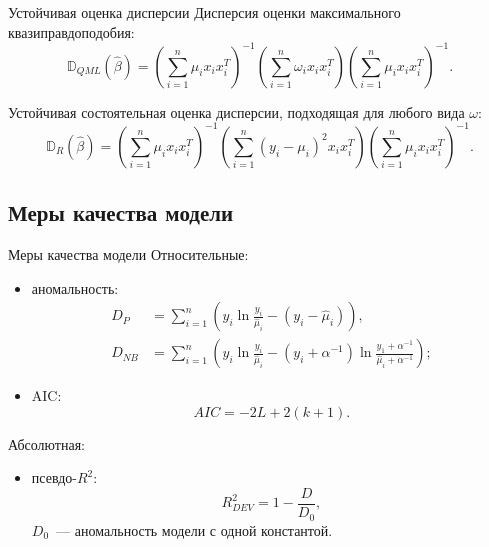 \documentclass[9pt,pdf,utf8,hyperref={unicode},aspectratio=169]{beamer}
\begin{document}
\begin{frame}{Устойчивая оценка дисперсии}
	Дисперсия оценки максимального квазиправдоподобия:
	$$\mathbb{D}_{QML}\left(\hat{\beta}\right) = \left( \sum\limits_{i=1}^n \mu_i x_i x_i^T\right)^{-1} \left( \sum\limits_{i=1}^n \omega_i x_i x_i^T\right) \left( \sum\limits_{i=1}^n \mu_i x_i x_i^T \right)^{-1}. $$
	
	\bigskip
	
	Устойчивая состоятельная оценка дисперсии, подходящая для любого вида $\omega$:
	$$\mathbb{D}_{R}\left(\hat{\beta}\right) = \left( \sum\limits_{i=1}^n \mu_i x_i x_i^T\right)^{-1} \left( \sum\limits_{i=1}^n \left(y_i-\mu_i\right)^2 x_i x_i^T\right) \left( \sum\limits_{i=1}^n \mu_i x_i x_i^T \right)^{-1}. $$
\end{frame}

\subsection{Меры качества модели}
\begin{frame}{Меры качества модели}
	Относительные:
	\begin{itemize}
		\item аномальность:
		\begin{align*}
		D_P    &= \sum\limits_{i=1}^n \left( y_i \ln \frac{y_i}{\hat{\mu}_i} - \left(y_i-\hat{\mu}_i \right) \right), \\%
		D_{NB} &= \sum\limits_{i=1}^n \left( y_i \ln \frac{y_i}{\hat{\mu}_i} - \left(y_i+\alpha^{-1}\right)\ln \frac{y_1 + \alpha^{-1}}{\hat{\mu}_i + \alpha^{-1}} \right);
		\end{align*}
		\item AIC: $$AIC = -2L +2\left(k+1\right).$$
	\end{itemize}
	
	\bigskip
	
	Абсолютная:
	\begin{itemize}
		\item псевдо-$R^2$:
		$$R^2_{DEV} = 1-\frac{D}{D_0},$$
		$D_0$~--- аномальность модели с одной константой.
	\end{itemize}
\end{frame}

%	
\end{document}
